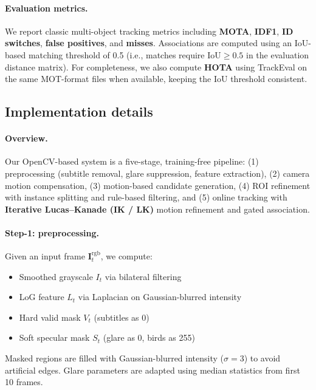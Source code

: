 \paragraph{Evaluation metrics.}
We report classic multi-object tracking metrics including \textbf{MOTA}, \textbf{IDF1}, \textbf{ID switches}, \textbf{false positives}, and \textbf{misses}. Associations are computed using an IoU-based matching threshold of 0.5 (i.e., matches require IoU$\ge 0.5$ in the evaluation distance matrix). For completeness, we also compute \textbf{HOTA} using TrackEval on the same MOT-format files when available, keeping the IoU threshold consistent.



\subsection{Implementation details}
\label{sec:exp_impl}


\paragraph{Overview.}
Our OpenCV-based system is a five-stage, training-free pipeline:
(1) preprocessing (subtitle removal, glare suppression, feature extraction),
(2) camera motion compensation,
(3) motion-based candidate generation,
(4) ROI refinement with instance splitting and rule-based filtering,
and (5) online tracking with \textbf{Iterative Lucas--Kanade (IK / LK)} motion refinement and gated association.

\paragraph{Step-1: preprocessing.}
Given an input frame $\mathbf{I}^{\text{rgb}}_t$, we compute:
\begin{itemize}
    \item Smoothed grayscale $I_t$ via bilateral filtering
    \item LoG feature $L_t$ via Laplacian on Gaussian-blurred intensity
    \item Hard valid mask $V_t$ (subtitles as 0)
    \item Soft specular mask $S_t$ (glare as 0, birds as 255)
\end{itemize}
Masked regions are filled with Gaussian-blurred intensity ($\sigma=3$) to avoid artificial edges. Glare parameters are adapted using median statistics from first 10 frames.



